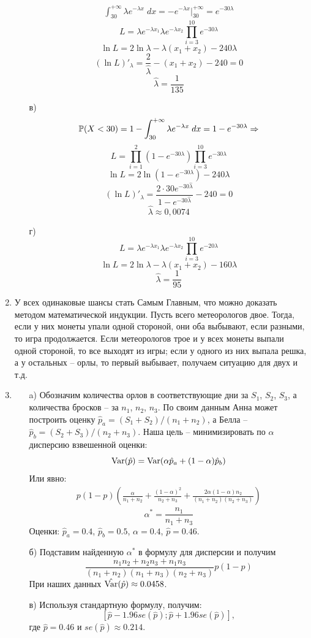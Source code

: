 \begin{enumerate}
\begin{enumerate}
\begin{align*}\int^{+\infty}_{30}\lambda e^{-\lambda x} \; dx=-e^{-\lambda x}|^{+\infty}_{30}=e^{-30\lambda}
\end{align*}
\[L=\lambda e^{-\lambda x_1}\lambda e^{-\lambda x_2}\prod^{10}_{i=3}e^{-30\lambda}\]
\[\ln L=2\ln \lambda-\lambda(x_1+x_2)-240\lambda\]
\[(\ln L)'_\lambda=\frac{2}{\hat{\lambda}}-(x_1+x_2)-240=0\]
\[\hat{\lambda}=\frac{1}{135}\]
\item[в)] 
\[\P(X<30)=1-\int^{+\infty}_{30}\lambda e^{-\lambda x} \; dx=1-e^{-30\lambda} \Rightarrow\]
\[L=\prod^{2}_{i=1}(1-e^{-30\lambda})\prod^{10}_{i=3}e^{-30\lambda}\]
\[\ln L=2\ln (1-e^{-30\lambda})-240\lambda\]
\[(\ln L)'_\lambda=\frac{2\cdot30e^{-30\hat{\lambda}}}{1-e^{-30\hat{\lambda}}}-240=0\]
\[\hat{\lambda}\approx0,0074\]
\item[г)]
\[L=\lambda e^{-\lambda x_1}\lambda e^{-\lambda x_2}\prod^{10}_{i=3}e^{-20\lambda}\]
\[\ln L=2\ln \lambda-\lambda(x_1+x_2)-160\lambda\]
\[\hat{\lambda}=\frac{1}{95}\]
\end{enumerate}
\item У всех одинаковые шансы стать Самым Главным, что можно доказать методом математической индукции. Пусть всего метеорологов двое. Тогда, если у них монеты упали одной стороной, они оба выбывают, если разными, то игра продолжается. Если метеорологов трое и у всех монеты выпали одной стороной, то все выходят из игры; если у одного из них выпала решка, а у остальных – орлы, то первый выбывает, получаем ситуацию для двух и т.д.
\item 
\begin{enumerate}
\item[a)] Обозначим количества орлов в соответствующие дни за $S_1$, $S_2$, $S_3$, а количества бросков – за $n_1$, $n_2$, $n_3$. По своим данным Анна может построить оценку $\hat{p}_a=(S_1+S_2)/(n_1+n_2)$, а Белла – $\hat{p}_b=(S_2+S_3)/(n_2+n_3)$. Наша цель – минимизировать по $\alpha$ дисперсию взвешенной оценки:
\[\Var(\hat{p})=\Var(\alpha\hat{p}_a+(1-\alpha)\hat{p}_b)\]
Или явно:
\begin{align*}
    p(1-p)\left(\frac{\alpha}{n_1+n_2}+\frac{(1-\alpha)^2}{n_2+n_3}+\frac{2\alpha(1-\alpha)n_2}{(n_1+n_2)(n_2+n_3)}\right)
\end{align*}
\[\alpha^*=\frac{n_1}{n_1+n_3}\]
Оценки: $\hat{p}_a=0.4$, $\hat{p}_b=0.5$, $\alpha=0.4$, $\hat{p}=0.46$.

\item[б)] Подставим найденную $\alpha^*$ в формулу для дисперсии и получим
\[\frac{n_1n_2+n_2n_3+n_1n_3}{(n_1+n_2)(n_1+n_3)(n_2+n_3)}p(1-p)\]
При наших данных $\hat{\Var}(\hat{p})\approx0.0458$.

\item[в)] Используя стандартную формулу, получим:
\[[\hat{p}-1.96se(\hat{p});\hat{p}+1.96se(\hat{p})],\]
где $\hat{p}=0.46$ и $se(\hat{p})\approx0.214$.
\end{enumerate}
\end{enumerate}

